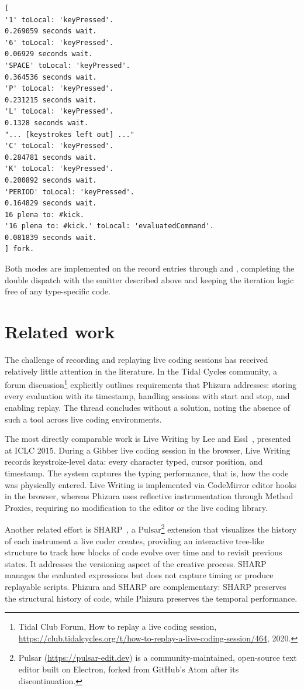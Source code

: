 \documentclass[
]{ceurart}
\begin{document}
\begin{lstlisting}[label={lst:emitted-mooflod},caption={Example of emitted MoofLOD code (middle elided)}]
[
'1' toLocal: 'keyPressed'.
0.269059 seconds wait.
'6' toLocal: 'keyPressed'.
0.06929 seconds wait.
'SPACE' toLocal: 'keyPressed'.
0.364536 seconds wait.
'P' toLocal: 'keyPressed'.
0.231215 seconds wait.
'L' toLocal: 'keyPressed'.
0.1328 seconds wait.
"... [keystrokes left out] ..."
'C' toLocal: 'keyPressed'.
0.284781 seconds wait.
'K' toLocal: 'keyPressed'.
0.200892 seconds wait.
'PERIOD' toLocal: 'keyPressed'.
0.164829 seconds wait.
16 plena to: #kick.
'16 plena to: #kick.' toLocal: 'evaluatedCommand'.
0.081839 seconds wait.
] fork.
\end{lstlisting}

Both modes are implemented on the record entries through  and , completing the double dispatch with the emitter described above and keeping the iteration logic free of any type-specific code.

\section{Related work}

The challenge of recording and replaying live coding sessions has received relatively little attention in the literature. In the Tidal Cycles community, a forum discussion\footnote{Tidal Club Forum, How to replay a live coding session, \url{https://club.tidalcycles.org/t/how-to-replay-a-live-coding-session/464}, 2020.} explicitly outlines requirements that Phizura addresses: storing every evaluation with its timestamp, handling sessions with start and stop, and enabling replay. The thread concludes without a solution, noting the absence of such a tool across live coding environments.

The most directly comparable work is Live Writing by Lee and Essl~\cite{Lee15a}, presented at ICLC 2015. During a Gibber live coding session in the browser, Live Writing records keystroke-level data: every character typed, cursor position, and timestamp. The system captures the typing performance, that is, how the code was physically entered. Live Writing is implemented via CodeMirror editor hooks in the browser, whereas Phizura uses reflective instrumentation through Method Proxies, requiring no modification to the editor or the live coding library.

Another related effort is SHARP~\cite{Bowm23a}, a Pulsar\footnote{Pulsar (\url{https://pulsar-edit.dev}) is a community-maintained, open-source text editor built on Electron, forked from GitHub's Atom after its discontinuation.} extension that visualizes the history of each instrument a live coder creates, providing an interactive tree-like structure to track how blocks of code evolve over time and to revisit previous states. It addresses the versioning aspect of the creative process. SHARP manages the evaluated expressions but does not capture timing or produce replayable scripts. Phizura and SHARP are complementary: SHARP preserves the structural history of code, while Phizura preserves the temporal performance.
\end{document}
